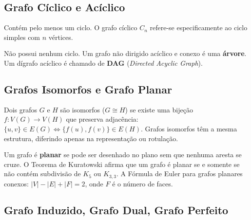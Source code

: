 \documentclass[12pt,a4paper]{article}
\begin{document}
\subsection{Grafo Cíclico e Acíclico}

\begin{description}[leftmargin=0pt]
  \item[Grafo Cíclico] Contém pelo menos um ciclo. O grafo cíclico $C_n$ refere-se especificamente ao ciclo simples com $n$ vértices.

  \item[Grafo Acíclico] Não possui nenhum ciclo. Um grafo não dirigido acíclico e conexo é uma \textbf{árvore}. Um dígrafo acíclico é chamado de \textbf{DAG} (\textit{Directed Acyclic Graph}).
\end{description}

\subsection{Grafos Isomorfos e Grafo Planar}

\begin{description}[leftmargin=0pt]
  \item[Grafos Isomorfos] Dois grafos $G$ e $H$ são isomorfos ($G \cong H$) se existe uma bijeção $f: V(G) \to V(H)$ que preserva adjacência: $\{u,v\} \in E(G) \Leftrightarrow \{f(u), f(v)\} \in E(H)$. Grafos isomorfos têm a mesma estrutura, diferindo apenas na representação ou rotulação.

  \item[Grafo Planar] Um grafo é \textbf{planar} se pode ser desenhado no plano sem que nenhuma aresta se cruze. O Teorema de Kuratowski afirma que um grafo é planar se e somente se não contém subdivisão de $K_5$ ou $K_{3,3}$. A Fórmula de Euler para grafos planares conexos: $|V| - |E| + |F| = 2$, onde $F$ é o número de faces.
\end{description}

\subsection{Grafo Induzido, Grafo Dual, Grafo Perfeito}
\end{document}
